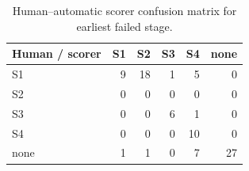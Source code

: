 \begin{table}[t]
\centering
\small
\begin{tabular}{lrrrrr}
\toprule
Human / scorer & S1 & S2 & S3 & S4 & none \\
\midrule
S1 & 9 & 18 & 1 & 5 & 0 \\
S2 & 0 & 0 & 0 & 0 & 0 \\
S3 & 0 & 0 & 6 & 1 & 0 \\
S4 & 0 & 0 & 0 & 10 & 0 \\
none & 1 & 1 & 0 & 7 & 27 \\
\bottomrule
\end{tabular}
\caption{Human--automatic scorer confusion matrix for earliest failed stage.}
\end{table}

